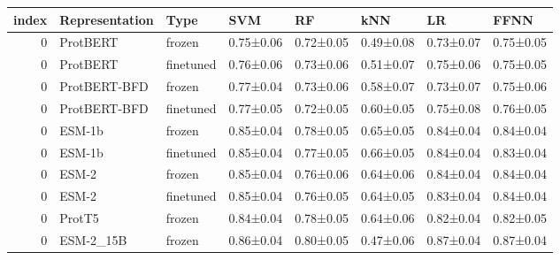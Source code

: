 \begin{tabular}{rlllllll}
\toprule
 index & Representation &      Type &       SVM &        RF &       kNN &        LR &      FFNN \\
\midrule
     0 &       ProtBERT &    frozen & 0.75±0.06 & 0.72±0.05 & 0.49±0.08 & 0.73±0.07 & 0.75±0.05 \\
     0 &       ProtBERT & finetuned & 0.76±0.06 & 0.73±0.06 & 0.51±0.07 & 0.75±0.06 & 0.75±0.05 \\
     0 &   ProtBERT-BFD &    frozen & 0.77±0.04 & 0.73±0.06 & 0.58±0.07 & 0.73±0.07 & 0.75±0.06 \\
     0 &   ProtBERT-BFD & finetuned & 0.77±0.05 & 0.72±0.05 & 0.60±0.05 & 0.75±0.08 & 0.76±0.05 \\
     0 &         ESM-1b &    frozen & 0.85±0.04 & 0.78±0.05 & 0.65±0.05 & 0.84±0.04 & 0.84±0.04 \\
     0 &         ESM-1b & finetuned & 0.85±0.04 & 0.77±0.05 & 0.66±0.05 & 0.84±0.04 & 0.83±0.04 \\
     0 &          ESM-2 &    frozen & 0.85±0.04 & 0.76±0.06 & 0.64±0.06 & 0.84±0.04 & 0.84±0.04 \\
     0 &          ESM-2 & finetuned & 0.85±0.04 & 0.76±0.05 & 0.64±0.05 & 0.83±0.04 & 0.84±0.04 \\
     0 &         ProtT5 &    frozen & 0.84±0.04 & 0.78±0.05 & 0.64±0.06 & 0.82±0.04 & 0.82±0.05 \\
     0 &      ESM-2_15B &    frozen & 0.86±0.04 & 0.80±0.05 & 0.47±0.06 & 0.87±0.04 & 0.87±0.04 \\
\bottomrule
\end{tabular}
